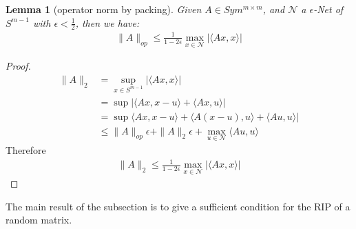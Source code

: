 \documentclass[a4paper,12pt, oneside, fleqn]{book}
\newtheorem{lemma}[theorem]{Lemma}
\theoremstyle{definition}
\theoremstyle{remark}
\begin{document}
\begin{lemma}[operator norm by packing]
	Given $A \in Sym^{m \times m}$, and $\mathcal{N}$ a $\epsilon$-Net of $S^{m-1}$ with $\epsilon < \frac{1}{2}$, then we have:
\begin{align*}
	\|A\|_{op} \leq \frac{1}{1 - 2 \epsilon}  \max_{ x \in \mathcal{N}} |\langle Ax, x \rangle|
\end{align*}
\end{lemma}
\begin{proof}
\begin{align*}
	\|A\|_2 &= \sup_{x \in S^{m-1}}|\langle Ax , x \rangle|\\
	&= \sup |\langle Ax, x - u\rangle + \langle Ax, u \rangle|\\
	&= \sup \langle Ax, x - u\rangle + \langle A (x - u), u \rangle + \langle Au, u \rangle |\\
	&\le \|A\|_{op} \epsilon + \|A\|_2 \epsilon + \max_{ u \in \mathcal{N}} \langle Au, u\rangle
\end{align*}
Therefore
\begin{align*}
	\|A\|_2 \le \frac{1}{1- 2 \epsilon} \max_{x \in \mathcal{N}} |\langle Ax, x \rangle|
\end{align*}
\end{proof}

The main result of the subsection is to give a sufficient condition for the RIP of a random matrix. 
\end{document}
